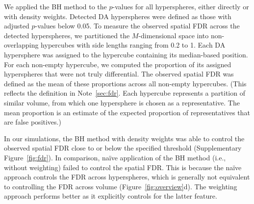 \documentclass{article}
\begin{document}
We applied the BH method to the $p$-values for all hyperspheres, either directly or with density weights.
Detected DA hyperspheres were defined as those with adjusted $p$-values below 0.05.
To measure the observed spatial FDR across the detected hyperspheres, we partitioned the $M$-dimensional space into non-overlapping hypercubes with side lengths ranging from 0.2 to 1.
Each DA hypersphere was assigned to the hypercube containing its median-based position.
For each non-empty hypercube, we computed the proportion of its assigned hyperspheres that were not truly differential.
The observed spatial FDR was defined as the mean of these proportions across all non-empty hypercubes.
(This reflects the definition in Note~\ref{sec:fdr}.
Each hypercube represents a partition of similar volume, from which one hypersphere is chosen as a representative.
The mean proportion is an estimate of the expected proportion of representatives that are false positives.)


In our simulations, the BH method with density weights was able to control the observed spatial FDR close to or below the specified threshold (Supplementary Figure~\ref{fig:fdr}).
In comparison, na\"ive application of the BH method (i.e., without weighting) failed to control the spatial FDR.
This is because the na\"ive approach controls the FDR across hyperspheres, which is generally not equivalent to controlling the FDR across volume (Figure~\ref{fig:overview}d).
The weighting approach performs better as it explicitly controls for the latter feature.
\end{document}
